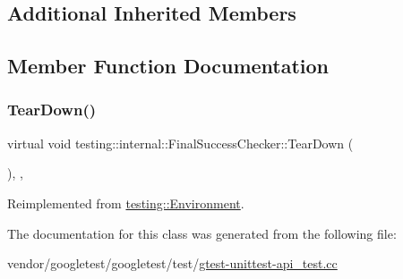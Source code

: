 \subsection*{Additional Inherited Members}


\subsection{Member Function Documentation}
\mbox{\label{classtesting_1_1internal_1_1_final_success_checker_a8f39d12a1f2bfe8c6c04b5c6749382c9}} 
\subsubsection{\texorpdfstring{Tear\+Down()}{TearDown()}}
{\footnotesize\ttfamily virtual void testing\+::internal\+::\+Final\+Success\+Checker\+::\+Tear\+Down (\begin{DoxyParamCaption}{ }\end{DoxyParamCaption})\hspace{0.3cm}{\ttfamily [inline]}, {\ttfamily [protected]}, {\ttfamily [virtual]}}



Reimplemented from \hyperlink{classtesting_1_1_environment_a039bdaa705c46b9b88234cf4d3bb6254}{testing\+::\+Environment}.



The documentation for this class was generated from the following file\+:\begin{DoxyCompactItemize}
\item 
vendor/googletest/googletest/test/\hyperlink{gtest-unittest-api__test_8cc}{gtest-\/unittest-\/api\+\_\+test.\+cc}\end{DoxyCompactItemize}
